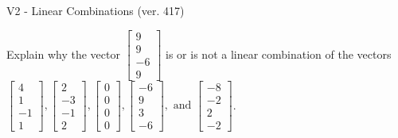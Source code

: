\begin{exercise}
  \begin{exerciseTitle}V2 - Linear Combinations (ver. 417)\end{exerciseTitle}
  \begin{exerciseStatement}
    Explain why the vector \(\left[\begin{array}{c}
9 \\
9 \\
-6 \\
9
\end{array}\right]\)  is or is not a linear 
	combination of the vectors \(\left[\begin{array}{c}
4 \\
1 \\
-1 \\
1
\end{array}\right] , \left[\begin{array}{c}
2 \\
-3 \\
-1 \\
2
\end{array}\right] , \left[\begin{array}{c}
0 \\
0 \\
0 \\
0
\end{array}\right] , \left[\begin{array}{c}
-6 \\
9 \\
3 \\
-6
\end{array}\right] , \text{ and } \left[\begin{array}{c}
-8 \\
-2 \\
2 \\
-2
\end{array}\right]\).
	



\end{exerciseStatement}
\end{exercise}
